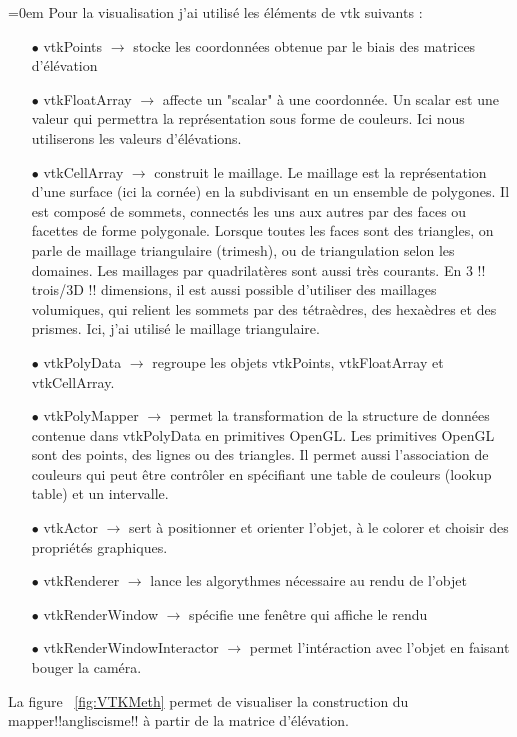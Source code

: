 \documentclass[a4paper,12pt]{article}
\begin{document}
\vspace{0.25cm}
\parindent=0em Pour la visualisation j'ai utilisé les éléments de vtk suivants :
\begin{itemize}\setlength{\itemsep}{1mm}
	\item[$\bullet$] vtkPoints	$\rightarrow$ stocke les coordonnées obtenue par le biais des matrices d'élévation 
	\item[$\bullet$] vtkFloatArray $\rightarrow$ affecte un "scalar" à une coordonnée. Un scalar est une valeur qui permettra la représentation sous forme de couleurs. Ici nous utiliserons les valeurs d'élévations.
	\item[$\bullet$] vtkCellArray $\rightarrow$ construit le maillage. Le maillage est la représentation d'une surface (ici la cornée) en la subdivisant en un ensemble de polygones. Il est composé de sommets,  connectés les uns aux autres par des faces ou facettes de forme polygonale. Lorsque toutes les faces sont des triangles, on parle de maillage triangulaire (trimesh), ou de triangulation selon les domaines. Les maillages par quadrilatères sont aussi très courants. En 3 !! trois/3D !! dimensions, il est aussi possible d'utiliser des maillages volumiques, qui relient les sommets par des tétraèdres, des hexaèdres et des prismes. Ici, j'ai utilisé le maillage triangulaire. 
	\item[$\bullet$] vtkPolyData $\rightarrow$ regroupe les objets vtkPoints, vtkFloatArray et vtkCellArray.
	\item[$\bullet$] vtkPolyMapper	$\rightarrow$ permet la transformation de la structure de données contenue dans vtkPolyData en primitives OpenGL. Les primitives OpenGL sont des points, des lignes ou des triangles. Il permet aussi l'association de couleurs qui peut être contrôler en spécifiant une table de couleurs (lookup table) et un intervalle.
	\item[$\bullet$] vtkActor $\rightarrow$ sert à positionner et orienter l'objet, à le colorer et choisir des propriétés graphiques. 
	\item[$\bullet$] vtkRenderer $\rightarrow$ lance les algorythmes nécessaire au rendu de l'objet
	\item[$\bullet$] vtkRenderWindow $\rightarrow$ spécifie une fenêtre qui affiche le rendu
	\item[$\bullet$] vtkRenderWindowInteractor $\rightarrow$ permet l'intéraction avec l'objet en faisant bouger la caméra.
\end{itemize}
 \vspace{0.25cm}
La figure ~\ref{fig:VTKMeth} permet de visualiser la construction du mapper!!angliscisme!! à partir de la matrice d'élévation.
\end{document}
